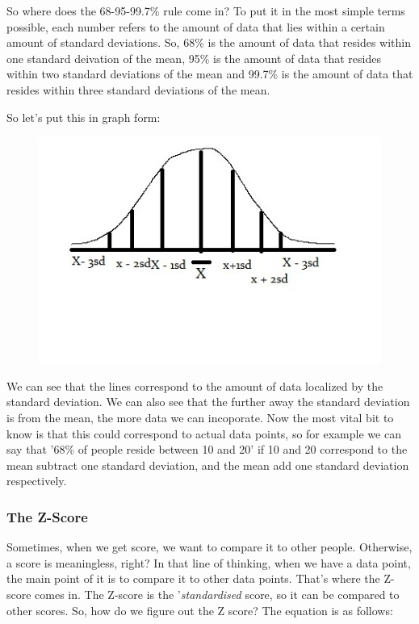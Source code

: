 \documentclass[11pt]{article}
\begin{document}
So where does the 68-95-99.7\% rule come in? To put it in the most simple terms possible, each number refers to the amount of data that lies within a certain amount of standard deviations. So, 68\% is the amount of data that resides within one standard deivation of the mean, 95\% is the amount of data that resides within two standard deviations of the mean and 99.7\% is the amount of data that resides within three standard deviations of the mean. 

So let's put this in graph form:

\clearpage{}
\begin{figure}[htp]
\centering
\includegraphics[scale=1.00]{BellCurve2Image10.jpg}
\end{figure}

We can see that the lines correspond to the amount of data localized by the standard deviation. We can also see that the further away the standard deviation is from the mean, the more data we can incoporate. Now the most vital bit to know is that this could correspond to actual data points, so for example we can say that '68\% of people reside between 10 and 20' if 10 and 20 correspond to the mean subtract one standard deviation, and the mean add one standard deviation respectively. 

\subsubsection*{The Z-Score}

Sometimes, when we get score, we want to compare it to other people. Otherwise, a score is meaningless, right? In that line of thinking, when we have a data point, the main point of it is to compare it to other data points. That's where the Z-score comes in. The Z-score is the '\emph{standardised} score, so it can be compared to other scores. So, how do we figure out the Z score? The equation is as follows:
\end{document}
